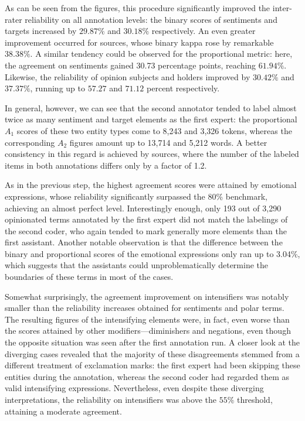 As can be seen from the figures, this procedure significantly improved
the inter-rater reliability on all annotation levels: the binary
scores of sentiments and targets increased by $29.87\%$ and $30.18\%$
respectively.  An even greater improvement occurred for sources, whose
binary kappa rose by remarkable $38.38\%$.  A similar tendency could
be observed for the proportional metric: here, the agreement on
sentiments gained 30.73 percentage points, reaching $61.94\%$.
Likewise, the reliability of opinion subjects and holders improved by
$30.42\%$ and $37.37\%$, running up to $57.27$ and $71.12$ percent
respectively.

In general, however, we can see that the second annotator tended to
label almost twice as many sentiment and target elements as the first
expert: the proportional $A_1$ scores of these two entity types come
to 8,243 and 3,326 tokens, whereas the corresponding $A_2$ figures
amount up to 13,714 and 5,212 words.  A better consistency in this
regard is achieved by sources, where the number of the labeled items
in both annotations differs only by a factor of 1.2.

As in the previous step, the highest agreement scores were attained by
emotional expressions, whose reliability significantly surpassed the
80\% benchmark, achieving an almost perfect level.  Interestingly
enough, only 193 out of 3,290 opinionated terms annotated by the first
expert did not match the labelings of the second coder, who again
tended to mark generally more elements than the first assistant.
Another notable observation is that the difference between the binary
and proportional scores of the emotional expressions only ran up to
3.04\%, which suggests that the assistants could unproblematically
determine the boundaries of these terms in most of the cases.

Somewhat surprisingly, the agreement improvement on intensifiers was
notably smaller than the reliability increases obtained for sentiments
and polar terms.  The resulting figures of the intensifying elements
were, in fact, even worse than the scores attained by other
modifiers---diminishers and negations, even though the opposite
situation was seen after the first annotation run.  A closer look at
the diverging cases revealed that the majority of these disagreements
stemmed from a different treatment of exclamation marks: the first
expert had been skipping these entities during the annotation, whereas
the second coder had regarded them as valid intensifying expressions.
Nevertheless, even despite these diverging interpretations, the
reliability on intensifiers was above the $55\%$ threshold, attaining
a moderate agreement.

